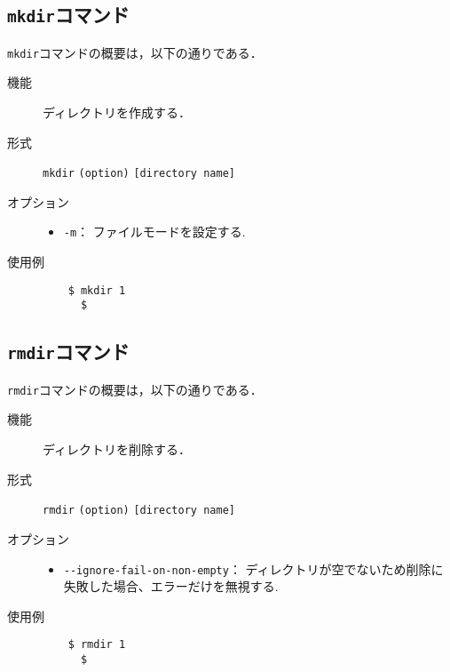 \documentclass[a4j,11pt]{jarticle}
\begin{document}
\subsection{\texttt{mkdir}コマンド}
\verb|mkdir|コマンドの概要は，以下の通りである．
\begin{description}
  \item[機能] %
    ディレクトリを作成する．
  \item[形式] %
    \verb|mkdir| \verb|(option)| \verb|[directory name]|
  \item[オプション] %
    \begin{itemize}
      \item \verb|-m|：  ファイルモードを設定する.
    \end{itemize}
  \item[使用例] %
    \begin{verbatim}
    $ mkdir 1
      $
    \end{verbatim}
\end{description}

\subsection{\texttt{rmdir}コマンド}
\verb|rmdir|コマンドの概要は，以下の通りである．
\begin{description}
  \item[機能] %
    ディレクトリを削除する．
  \item[形式] %
    \verb|rmdir| \verb|(option)| \verb|[directory name]|
  \item[オプション] %
    \begin{itemize}
      \item \verb|--ignore-fail-on-non-empty|：  ディレクトリが空でないため削除に失敗した場合、エラーだけを無視する.
    \end{itemize}
  \item[使用例] %
    \begin{verbatim}
    $ rmdir 1
      $
    \end{verbatim}
\end{description}
\end{document}
